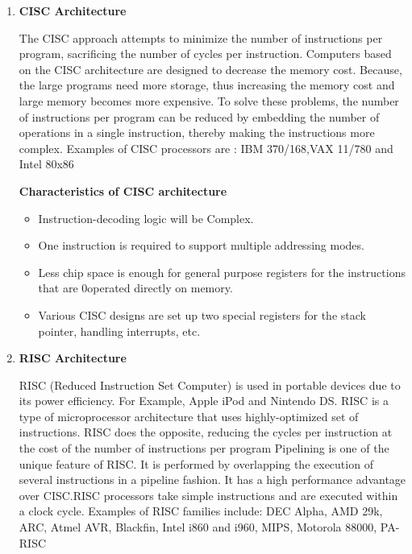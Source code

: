 \documentclass[12pt]{report}
\begin{document}
\begin{enumerate}
\item \textbf{CISC Architecture}

The CISC approach attempts to minimize the number of instructions per program, sacrificing the number of cycles per instruction. Computers based on the CISC architecture are designed to decrease the memory cost. Because, the large programs need more storage, thus increasing the memory cost and large memory becomes more expensive. To solve these problems, the number of instructions per program can be reduced by embedding the number of operations in a single instruction, thereby making the instructions more complex. Examples of CISC processors are : 
IBM 370/168,VAX 11/780 and Intel 80x86 


\textbf{Characteristics of CISC architecture}
\begin{itemize}
\item Instruction-decoding logic will be Complex.
\item One instruction is required to support multiple addressing modes.
\item Less chip space is enough for general purpose registers for the instructions that are 0operated directly on memory.
\item Various CISC designs are set up two special registers for the stack pointer, handling interrupts,  etc.
\end{itemize}

\item \textbf{RISC Architecture}

RISC (Reduced Instruction Set Computer) is used in portable devices due to its power efficiency. For Example, Apple iPod and Nintendo DS. RISC is a type of microprocessor architecture that uses highly-optimized set of instructions. RISC does the opposite, reducing the cycles per instruction at the cost of the number of instructions per program Pipelining is one of the unique feature of RISC. It is performed by overlapping the execution of several instructions in a pipeline fashion. It has a high performance advantage over CISC.RISC processors take simple instructions and are executed within a clock cycle. Examples of RISC families include: DEC Alpha, AMD 29k, ARC, Atmel AVR, Blackfin, Intel i860 and i960, MIPS, Motorola 88000, PA-RISC


\end{enumerate}
\end{document}
